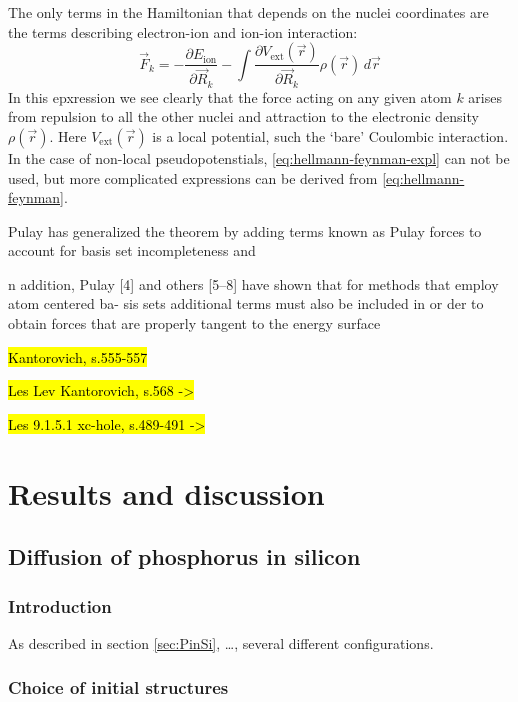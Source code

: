\documentclass[11pt,bibliography=totoc,index=totoc]{scrbook}   %
\newcommand{\comment}[1]{\hl{#1}}
\begin{document}
The only terms in the Hamiltonian that depends on the nuclei coordinates are the terms describing
electron-ion and ion-ion interaction:
\begin{equation}
  \vec{F}_k = - \frac{\partial E_{\text{ion}}}{\partial\vec{R}_k} - \int \frac{\partial V_{\text{ext}}(\vec{r})}{\partial\vec{R}_k} \rho(\vec{r}) \,d\vec{r}
  \label{eq:hellmann-feynman-expl}
\end{equation}
In this epxression we see clearly that the force acting on any given atom $k$ arises from repulsion to all the other nuclei and attraction to the electronic density $\rho(\vec{r})$. Here $V_{\text{ext}}(\vec{r})$ is a local potential, such the `bare' Coulombic interaction. 
In the case of non-local pseudopotenstials, \eqref{eq:hellmann-feynman-expl} can not be used, but more complicated expressions can be derived from \eqref{eq:hellmann-feynman}.



Pulay\cite{Pulay:1969} has generalized the theorem by adding terms known as Pulay forces to account
for basis set incompleteness and 

n addition, Pulay [4] and others [5–8] have shown that for methods that employ atom centered ba- sis sets additional terms must also be included in or
der to obtain forces that are properly tangent to the energy surface


\comment{Kantorovich, s.555-557}

\comment{Les Lev Kantorovich, s.568 ->}

\comment{Les 9.1.5.1 xc-hole, s.489-491 ->}






\part{Results and discussion}

\chapter{Diffusion of phosphorus in silicon}

\section{Introduction}\label{sec:resultsIntro}

As described in section \ref{sec:PinSi}, \ldots, several different configurations.


\section{Choice of initial structures}\label{sec:structures}
\end{document}
